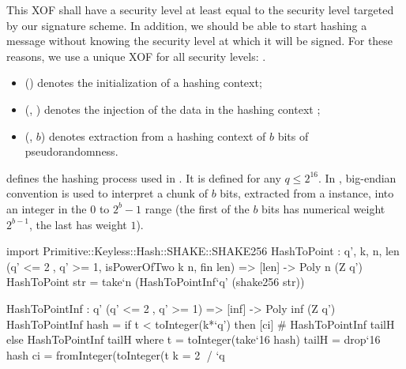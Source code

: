 This XOF shall have a security level at least equal to the security level targeted by our signature scheme. In addition, we should be able to start hashing a message without knowing the security level at which it will be signed. For these reasons, we use a unique XOF for all security levels: \shake.
\begin{itemize}
 \item \shakeinit() denotes the initialization of a \shake hashing context;
 \item \shakeinject(\shakectx, \str) denotes the injection of the data \str in the hashing context \shakectx;
 \item \shakeextract(\shakectx, $b$) denotes extraction from a hashing context \shakectx of $b$ bits of pseudorandomness.
\end{itemize}

\longhashtopoint defines the hashing process used in \falcon. It is defined for any $q \leq 2^{16}$. In \falcon, big-endian convention is used to interpret a chunk of $b$
bits, extracted from a \shake instance, into an integer in the $0$ to
$2^b-1$ range (the first of the $b$ bits has numerical weight $2^{b-1}$,
the last has weight $1$).

\begin{algorithm}[htb]
\caption{$\hashtopoint(\str, q, n)$}\label{alg:hashtopoint}
\begin{algorithmic}[1]
\State{$\shakectx \gets \shakeinit()$}
\State{$\shakeinject(\shakectx, \str)$}
\label{step:extract}
 \label{alg:hashtopoint:cmp}\label{step:check}
 \label{alg:hashtopoint:mod}
\EndIf
\EndWhile
{}
\end{algorithmic}
\end{algorithm}

\begin{code}
  import Primitive::Keyless::Hash::SHAKE::SHAKE256
  HashToPoint : {q', k, n, len}
    (q' <= 2^^16, q' >= 1, isPowerOfTwo k n, fin len) =>
    [len] -> Poly n (Z q')
  HashToPoint str = take`{n} (HashToPointInf`{q'} (shake256 str))

  HashToPointInf : {q'} (q' <= 2^^16, q' >= 1) =>
    [inf] -> Poly inf (Z q')
  HashToPointInf hash =
    if t < toInteger(k*`q') then
      [ci] # HashToPointInf tailH
    else
      HashToPointInf tailH
    where
      t = toInteger(take`{16} hash)
      tailH = drop`{16} hash
      ci = fromInteger(toInteger(t%
      k = 2^^16 / `q
\end{code}


